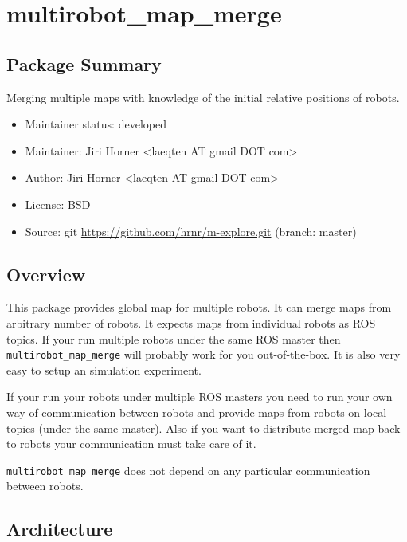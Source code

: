 \chapter{multirobot_map_merge}

\section{Package Summary}

Merging multiple maps with knowledge of the initial relative positions of robots.

\begin{itemize}
    \item Maintainer status: developed
    \item Maintainer: Jiri Horner \textless laeqten AT gmail DOT com\textgreater
    \item Author: Jiri Horner \textless laeqten AT gmail DOT com\textgreater
    \item License: BSD
    \item Source: git \url{https://github.com/hrnr/m-explore.git} (branch: master)
\end{itemize}

\section{Overview}

This package provides global map for multiple robots. It can merge maps from arbitrary number of robots. It expects maps from individual robots as ROS topics. If your run multiple robots under the same ROS master then \texttt{multirobot_\-map_\-merge} will probably work for you out-of-the-box. It is also very easy to setup an simulation experiment.


If your run your robots under multiple ROS masters you need to run your own way of communication between robots and provide maps from robots on local topics (under the same master). Also if you want to distribute merged map back to robots your communication must take care of it.


\texttt{multirobot_map_merge} does not depend on any particular communication between robots.

\section{Architecture}

